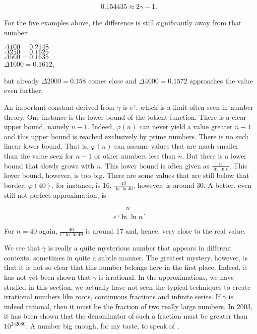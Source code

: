 \documentclass[tikz]{scrreprt}
\begin{document}
\begin{equation}
0.154435 \approx 2\gamma - 1.
\end{equation}

For the five examples above, the difference
is still significantly away from that number:

$\Delta 100 = 0.2148$\\
$\Delta 250 = 0.1625$\\
$\Delta 500 = 0.1635$\\
$\Delta 1000= 0.1612$,

but already $\Delta 2000 = 0.158$ comes close and
$\Delta 4000 = 0.1572$ 
approaches the value even further.

An important constant derived from $\gamma$ is
$e^{\gamma}$, which is a limit often seen in 
number theory. One instance is the lower bound
of the totient function. There is a clear upper bound,
namely $n-1$. Indeed, $\varphi(n)$ can never 
yield a value greater $n-1$ and this upper bound
is reached exclusively by prime numbers.
There is no such linear lower bound. 
That is, $\varphi(n)$ can assume values that are much smaller
than the value seen for $n-1$ or other numbers less than $n$.
But there is a lower bound that slowly grows with $n$.
This lower bound is often given as $\frac{n}{\ln\ln n}$.
This lower bound, however, is too big.
There are some values that are still below that border.
$\varphi(40)$, for instance, is 16.
$\frac{40}{\ln \ln 40}$, however, is around 30.
A better, even still not perfect approximation, is

\[
\frac{n}{e^{\gamma}\ln \ln n}.
\]

For $n=40$ again,
$\frac{40}{e^{\gamma}\ln \ln 40}$ is around 17 and, hence,
very close to the real value.

We see that $\gamma$ is really a quite mysterious number
that appears in different contexts, sometimes in quite
a subtle manner.
The greatest mystery, however, is that it is not so clear
that this number belongs here in the first place.
Indeed, it has not yet been shown that $\gamma$ is irrational.
In the approximations, we have studied in this section,
we actually have not seen 
the typical techniques to create irrational numbers 
like roots, continuous fractions and infinite series.
If $\gamma$ is indeed rational, then it must be the fraction
of two really large numbers. In 2003, it has been shown
that the denominator of such a fraction must be greater
than $10^{242080}$. 
A number big enough, for my taste, to speak of .
\end{document}
